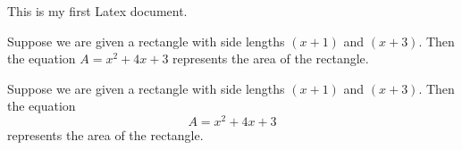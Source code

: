 \documentclass[11pt]{article}
\begin{document}
This is my first Latex document.

Suppose we are given a rectangle with side 
lengths $(x+1)$ and $(x+3)$. Then the equation 
$A=x^2+4x+3$ represents the area of the rectangle.

Suppose we are given a rectangle with side 
lengths $(x+1)$ and $(x+3)$. Then the equation 
$$A=x^2+4x+3$$ represents the area of the rectangle.
\end{document}
